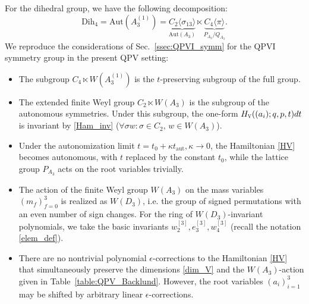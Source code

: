 \documentclass[12pt,a4paper]{article}
\numberwithin{equation}{section}
\newcommand{\V}{\scalebox{.6}{V}}
\begin{document}
For the dihedral group, we have the following decomposition:
\begin{equation}
\mathrm{Dih}_4=\mathrm{Aut}\left(A_3^{(1)}\right)=\underbrace{C_2\langle\sigma_{13}\rangle}_{\mathrm{Aut}(A_3)}\ltimes \underbrace{C_4\langle\pi\rangle}_{P_{A_3}/Q_{A_3}}.    
\end{equation}
We reproduce the considerations of Sec.~\ref{ssec:QPVI_symm} for the QPVI symmetry group in the present QPV setting: 
\begin{itemize}
    \item The subgroup $C_4\ltimes W\left(A_3^{(1)}\right)$ is the $t$-preserving subgroup of the full group.
    \item The extended finite Weyl group $C_2\ltimes W(A_3)$ is the subgroup of the autonomous symmetries. Under this subgroup, the one-form $H_{\V}((a_i);q,p,t)dt$ is invariant by \eqref{Ham_inv} ($\forall\sigma w: \sigma\in C_2, \, w\in W(A_3)$).
    \item  Under the autonomization limit $t=t_0+\kappa t_{\textrm{aut}}, \kappa\rightarrow0$, the Hamiltonian \eqref{HV} becomes autonomous, with $t$ replaced by the constant $t_0$, while the lattice group $P_{A_3}$ acts on the root variables trivially.  
    \item The action of the finite Weyl group $W(A_3)$ on the mass variables $(m_f)_{f=0}^3$ is realized as $W(D_3)$, i.e. the group of signed permutations with an even number of sign changes. For the ring of $W(D_3)$-invariant polynomials, we take the basic invariants
 $w_2^{[3]},e_3^{[3]},w_4^{[3]}$ (recall the notation \eqref{elem_def}). 
    \item There are no nontrivial polynomial $\epsilon$-corrections to the Hamiltonian \eqref{HV} that simultaneously preserve the dimensions \eqref{dim_V} and the $W(A_3)$-action given in Table~\ref{table:QPV_Backlund}. However, the root variables $(a_i)_{i=1}^3$ may be shifted by arbitrary linear $\epsilon$-corrections.
\end{itemize}
\end{document}

